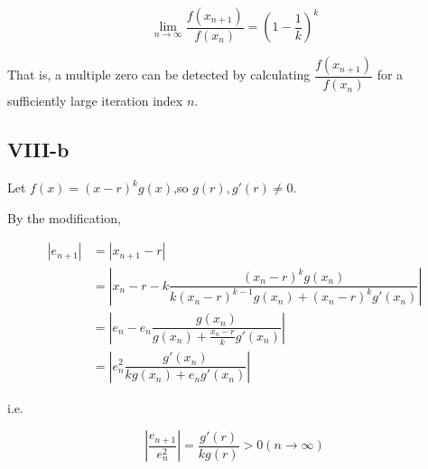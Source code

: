 \documentclass[a4paper]{article}
\begin{document}
$$\lim\limits_{n\rightarrow\infty}\dfrac{f(x_{n+1})}{f(x_n)} = (1 - \dfrac1k)^k$$

That is, a multiple zero can be detected by calculating $\dfrac{f(x_{n+1})}{f(x_n)}$ for a sufficiently large iteration index $n$.

\subsection*{VIII-b}

Let $f(x) = (x-r)^kg(x)$,so $g(r),g'(r) \neq 0$.

By the modification,

$$\begin{aligned}
    |e_{n+1}| & = |x_{n+1} - r|\\
    & = |x_n - r - k \dfrac{(x_n - r)^k g(x_n)}{k(x_n - r)^{k-1}g(x_n) + (x_n - r)^k g'(x_n)}|\\
    & = |e_n - e_n \dfrac{g(x_n)}{g(x_n)+\frac{x_n - r}{k}g'(x_n)}|\\
    & = |e_n^2 \dfrac{g'(x_n)}{kg(x_n)+e_ng'(x_n)}|
\end{aligned}$$

i.e. 

$$|\dfrac{e_{n+1}}{e^2_n}| = \dfrac{g'(r)}{kg(r)} > 0(n \rightarrow \infty)$$



\end{document}
